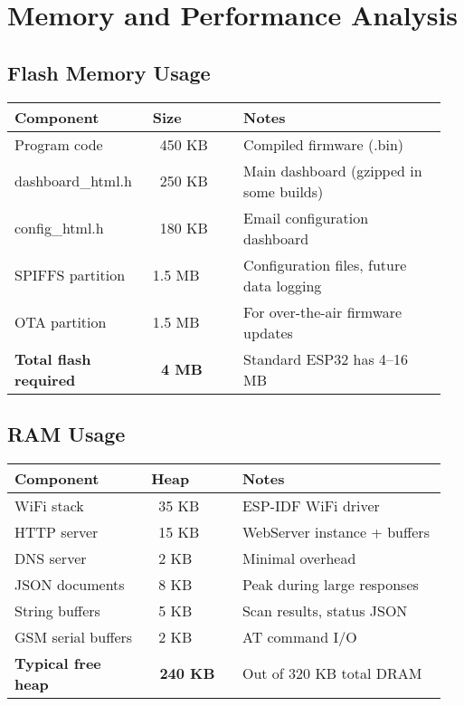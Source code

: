 \documentclass[11pt,a4paper]{article}
\begin{document}
\section{Memory and Performance Analysis}

\subsection{Flash Memory Usage}

\begin{longtable}{>{\raggedright\arraybackslash}p{0.3\linewidth} p{0.2\linewidth} p{0.45\linewidth}}
\hline
\textbf{Component} & \textbf{Size} & \textbf{Notes} \\
\hline
\endhead
Program code & ~450 KB & Compiled firmware (.bin) \\
dashboard\_html.h & ~250 KB & Main dashboard (gzipped in some builds) \\
config\_html.h & ~180 KB & Email configuration dashboard \\
SPIFFS partition & 1.5 MB & Configuration files, future data logging \\
OTA partition & 1.5 MB & For over-the-air firmware updates \\
\textbf{Total flash required} & \textbf{~4 MB} & Standard ESP32 has 4--16 MB \\
\hline
\end{longtable}

\subsection{RAM Usage}

\begin{longtable}{>{\raggedright\arraybackslash}p{0.3\linewidth} p{0.2\linewidth} p{0.45\linewidth}}
\hline
\textbf{Component} & \textbf{Heap} & \textbf{Notes} \\
\hline
\endhead
WiFi stack & ~35 KB & ESP-IDF WiFi driver \\
HTTP server & ~15 KB & WebServer instance + buffers \\
DNS server & ~2 KB & Minimal overhead \\
JSON documents & ~8 KB & Peak during large responses \\
String buffers & ~5 KB & Scan results, status JSON \\
GSM serial buffers & ~2 KB & AT command I/O \\
\textbf{Typical free heap} & \textbf{~240 KB} & Out of 320 KB total DRAM \\
\hline
\end{longtable}
\end{document}
